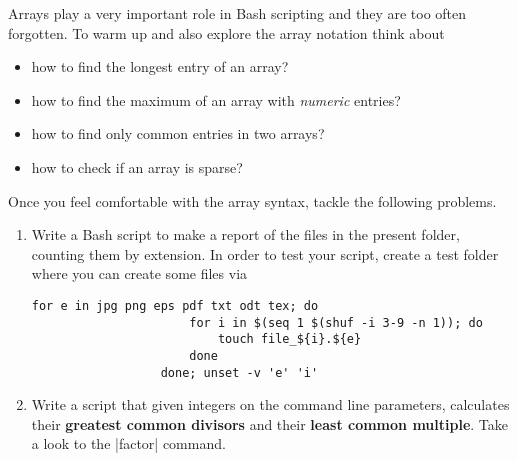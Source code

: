 
    Arrays play a very important role in Bash scripting and they are too often forgotten.
    To warm up and also explore the array notation think about
    \begin{itemize}
        \item how to find the longest entry of an array?
        \item how to find the maximum of an array with \emph{numeric} entries?
        \item how to find only common entries in two arrays?
        \item how to check if an array is sparse?
    \end{itemize}
    Once you feel comfortable with the array syntax, tackle the following problems.
    \begin{enumerate}[after=\vspace{-\baselineskip}]
        \item Write a Bash script to make a report of the files in the present folder, counting them by extension.
              In order to test your script, create a test folder where you can create some files via
              \begin{lstlisting}[style=MyBash]
                  for e in jpg png eps pdf txt odt tex; do
                      for i in $(seq 1 $(shuf -i 3-9 -n 1)); do
                          touch file_${i}.${e}
                      done
                  done; unset -v 'e' 'i'
              \end{lstlisting}
        \item Write a script that given integers on the command line parameters, calculates their \textbf{greatest common divisors} and their \textbf{least common multiple}.
              Take a look to the \bash|factor| command.
    \end{enumerate}
    

\EndExercise[DodgerBlue]

